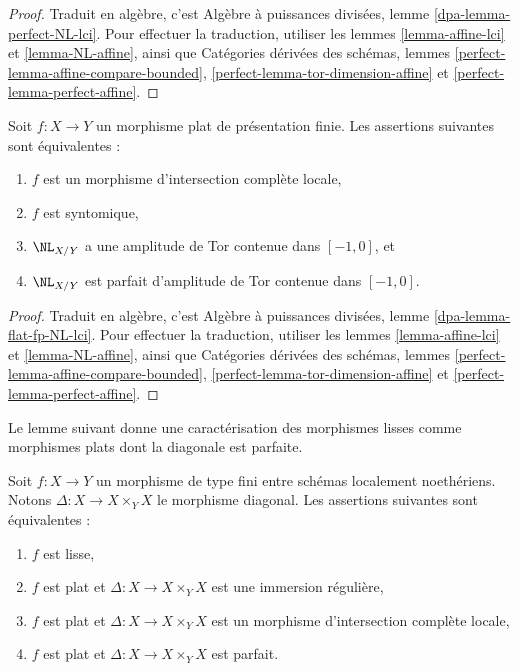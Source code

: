 \begin{proof}
Traduit en algèbre, c'est
Algèbre à puissances divisées, lemme \ref{dpa-lemma-perfect-NL-lci}.
Pour effectuer la traduction, utiliser
les lemmes \ref{lemma-affine-lci} et
\ref{lemma-NL-affine}, ainsi que
Catégories dérivées des schémas, lemmes
\ref{perfect-lemma-affine-compare-bounded},
\ref{perfect-lemma-tor-dimension-affine} et
\ref{perfect-lemma-perfect-affine}.
\end{proof}

\begin{lemma}
\label{lemma-flat-fp-NL-lci}
Soit $f : X \to Y$ un morphisme plat de présentation finie.
Les assertions suivantes sont équivalentes :
\begin{enumerate}
\item $f$ est un morphisme d'intersection complète locale,
\item $f$ est syntomique,
\item $\NL_{X/Y}$ a une amplitude de Tor contenue dans $[-1, 0]$, et
\item $\NL_{X/Y}$ est parfait d'amplitude de Tor contenue dans $[-1, 0]$.
\end{enumerate}
\end{lemma}

\begin{proof}
Traduit en algèbre, c'est
Algèbre à puissances divisées, lemme \ref{dpa-lemma-flat-fp-NL-lci}.
Pour effectuer la traduction, utiliser
les lemmes \ref{lemma-affine-lci} et
\ref{lemma-NL-affine}, ainsi que
Catégories dérivées des schémas, lemmes
\ref{perfect-lemma-affine-compare-bounded},
\ref{perfect-lemma-tor-dimension-affine} et
\ref{perfect-lemma-perfect-affine}.
\end{proof}

\noindent
Le lemme suivant donne une caractérisation des morphismes lisses comme morphismes
plats dont la diagonale est parfaite.

\begin{lemma}
\label{lemma-smooth-diagonal-perfect}
Soit $f : X \to Y$ un morphisme de type fini entre schémas localement noethériens.
Notons $\Delta : X \to X \times_Y X$ le morphisme diagonal.
Les assertions suivantes sont équivalentes :
\begin{enumerate}
\item $f$ est lisse,
\item $f$ est plat et $\Delta : X \to X \times_Y X$ est une immersion régulière,
\item $f$ est plat et $\Delta : X \to X \times_Y X$ est un
morphisme d'intersection complète locale,
\item $f$ est plat et $\Delta : X \to X \times_Y X$ est parfait.
\end{enumerate}
\end{lemma}

